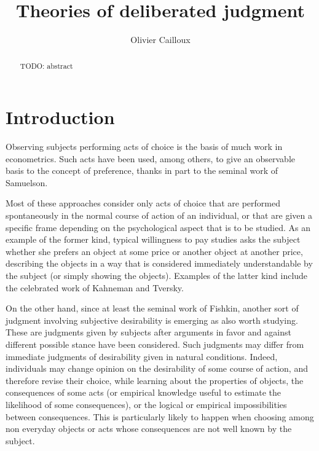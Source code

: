 \documentclass[version=last, pagesize, twoside=off, bibliography=totoc, DIV=calc, fontsize=12pt, a4paper, french, english]{scrartcl}
\begin{document}
\title{Theories of deliberated judgment}
\author{Olivier Cailloux}
\makeatletter
\makeatother
\maketitle

\begin{abstract}
	TODO: abstract
\end{abstract}

\section{Introduction} 
Observing subjects performing acts of choice is the basis of much work in econometrics. Such acts have been used, among others, to give an observable basis to the concept of preference, thanks in part to the seminal work of Samuelson. %

Most of these approaches consider only acts of choice that are performed spontaneously in the normal course of action of an individual, or that are given a specific frame depending on the psychological aspect that is to be studied. As an example of the former kind, typical willingness to pay studies asks the subject whether she prefers an object at some price or another object at another price, describing the objects in a way that is considered immediately understandable by the subject (or simply showing the objects). Examples of the latter kind include the celebrated work of Kahneman and Tversky.

On the other hand, since at least the seminal work of Fishkin, another sort of judgment involving subjective desirability is emerging as also worth studying. These are judgments given by subjects after arguments in favor and against different possible stance have been considered. Such judgments may differ from immediate judgments of desirability given in natural conditions. Indeed, individuals may change opinion on the desirability of some course of action, and therefore revise their choice, while learning about the properties of objects, the consequences of some acts (or empirical knowledge useful to estimate the likelihood of some consequences), or the logical or empirical impossibilities between consequences. This is particularly likely to happen when choosing among non everyday objects or acts whose consequences are not well known by the subject. 
\end{document}
